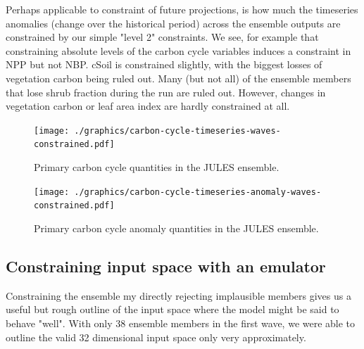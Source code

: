 \documentclass[gmd, manuscript]{copernicus}
\begin{document}
Perhaps applicable to constraint of future projections, is how much the timeseries anomalies (change over the historical period) across the ensemble outputs are constrained by our simple "level 2" constraints. We see, for example that constraining absolute levels of the carbon cycle variables induces a constraint in NPP but not NBP. cSoil is constrained slightly, with the biggest losses of vegetation carbon being ruled out. Many (but not all) of the ensemble members that lose shrub fraction during the run are ruled out. However, changes in vegetation carbon or leaf area index are hardly constrained at all.


\begin{figure}[t]
\texttt{[image: ./graphics/carbon-cycle-timeseries-waves-constrained.pdf]}
\caption{Primary carbon cycle quantities in the JULES ensemble.}
\label{fig:carbon-cycle-timeseries-waves-constrained}
\end{figure}

%
\begin{figure}[t]
\texttt{[image: ./graphics/carbon-cycle-timeseries-anomaly-waves-constrained.pdf]}
\caption{Primary carbon cycle anomaly quantities in the JULES ensemble.}
\label{fig:carbon-cycle-timeseries-anomaly-waves-constrained}
\end{figure}


\subsection{Constraining input space with an emulator}\label{ssec:constraining_input_space_emulator}

Constraining the ensemble my directly rejecting implausible members gives us a useful but rough outline of the input space where the model might be said to behave "well". With only 38 ensemble members in the first wave, we were able to outline the valid 32 dimensional input space only very approximately.
\end{document}
